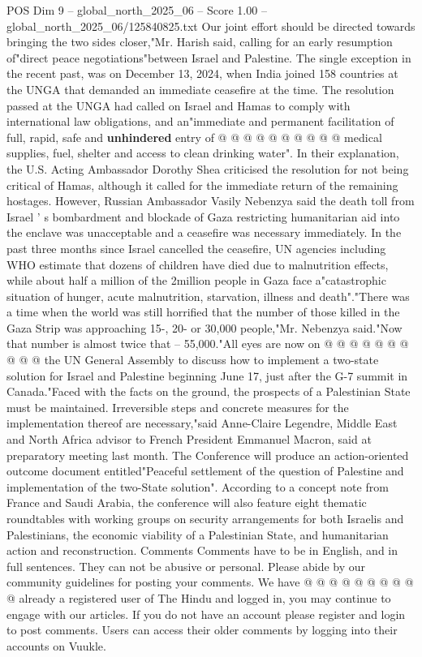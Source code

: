 \begin{textsample}{POS Dim 9 – global\_north\_2025\_06 – Score 1.00 – global\_north\_2025\_06/125840825.txt}
Our joint effort should be directed towards bringing the two sides closer,"Mr.
Harish said, calling for an early resumption of"direct peace negotiations"between Israel and Palestine.
The single exception in the recent past, was on December 13, 2024, when India joined 158 countries at the UNGA that demanded an immediate ceasefire at the time.
The resolution passed at the UNGA had called on Israel and Hamas to comply with international law obligations, and an"immediate and permanent facilitation of full, rapid, safe and \textbf{unhindered} entry of @ @ @ @ @ @ @ @ @ @ medical supplies, fuel, shelter and access to clean drinking water".
In their explanation, the U.S.
Acting Ambassador Dorothy Shea criticised the resolution for not being critical of Hamas, although it called for the immediate return of the remaining hostages.
However, Russian Ambassador Vasily Nebenzya said the death toll from Israel ' s bombardment and blockade of Gaza restricting humanitarian aid into the enclave was unacceptable and a ceasefire was necessary immediately.
In the past three months since Israel cancelled the ceasefire, UN agencies including WHO estimate that dozens of children have died due to malnutrition effects, while about half a million of the 2million people in Gaza face a"catastrophic situation of hunger, acute malnutrition, starvation, illness and death"."There was a time when the world was still horrified that the number of those killed in the Gaza Strip was approaching 15-, 20- or 30,000 people,"Mr.
Nebenzya said."Now that number is almost twice that -- 55,000."All eyes are now on @ @ @ @ @ @ @ @ @ @ the UN General Assembly to discuss how to implement a two-state solution for Israel and Palestine beginning June 17, just after the G-7 summit in Canada."Faced with the facts on the ground, the prospects of a Palestinian State must be maintained.
Irreversible steps and concrete measures for the implementation thereof are necessary,"said Anne-Claire Legendre, Middle East and North Africa advisor to French President Emmanuel Macron, said at preparatory meeting last month.
The Conference will produce an action-oriented outcome document entitled"Peaceful settlement of the question of Palestine and implementation of the two-State solution".
According to a concept note from France and Saudi Arabia, the conference will also feature eight thematic roundtables with working groups on security arrangements for both Israelis and Palestinians, the economic viability of a Palestinian State, and humanitarian action and reconstruction.
Comments Comments have to be in English, and in full sentences.
They can not be abusive or personal.
Please abide by our community guidelines for posting your comments.
We have @ @ @ @ @ @ @ @ @ @ already a registered user of The Hindu and logged in, you may continue to engage with our articles.
If you do not have an account please register and login to post comments.
Users can access their older comments by logging into their accounts on Vuukle.

\end{textsample}
